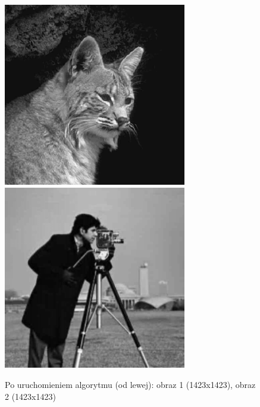 \documentclass[a4paper,12pt]{book}
\begin{document}
\begin{figure}[H]
	\caption{Po uruchomieniem algorytmu (od lewej): obraz 1 (1423x1423), obraz 2 (1423x1423)}
	\includegraphics[width=8cm, height=8cm]{1-2/raster-gray-cat-photoman.png}
	\includegraphics[width=8cm, height=8cm]{1-2/raster-gray-photoman-cat.png}
\end{figure}
\end{document}
